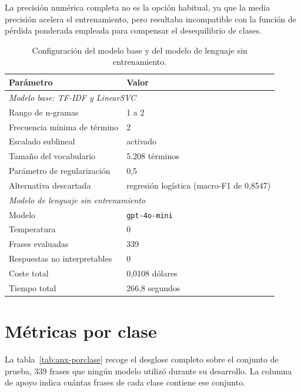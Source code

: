 La precisión numérica completa no es la opción habitual, ya que la media
precisión acelera el entrenamiento, pero resultaba incompatible con la función
de pérdida ponderada empleada para compensar el desequilibrio de clases.

\begin{table}[htbp]
  \centering
  \caption{Configuración del modelo base y del modelo de lenguaje sin
           entrenamiento.}
  \label{tab:anx-hiper-otros}
  \begin{tabularx}{\textwidth}{lX}
    \toprule
    Parámetro & Valor \\
    \midrule
    \multicolumn{2}{l}{\textit{Modelo base: TF-IDF y LinearSVC}} \\
    Rango de n-gramas            & 1 a 2 \\
    Frecuencia mínima de término & 2 \\
    Escalado sublineal           & activado \\
    Tamaño del vocabulario       & 5.208 términos \\
    Parámetro de regularización  & 0,5 \\
    Alternativa descartada       & regresión logística (macro-F1 de 0,8547) \\
    \midrule
    \multicolumn{2}{l}{\textit{Modelo de lenguaje sin entrenamiento}} \\
    Modelo                       & \texttt{gpt-4o-mini} \\
    Temperatura                  & 0 \\
    Frases evaluadas             & 339 \\
    Respuestas no interpretables & 0 \\
    Coste total                  & 0,0108 dólares \\
    Tiempo total                 & 266,8 segundos \\
    \bottomrule
  \end{tabularx}
\end{table}

\section{Métricas por clase}
\label{anx:por-clase}

La tabla~\ref{tab:anx-porclase} recoge el desglose completo sobre el conjunto de
prueba, 339 frases que ningún modelo utilizó durante su desarrollo. La columna de
apoyo indica cuántas frases de cada clase contiene ese conjunto.

